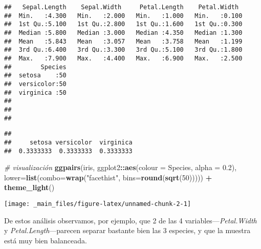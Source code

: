 \documentclass[]{book}
\newenvironment{Shaded}{\begin{snugshade}}{\end{snugshade}}
\newcommand{\CommentTok}[1]{\textcolor[rgb]{0.56,0.35,0.01}{\textit{#1}}}
\newcommand{\DataTypeTok}[1]{\textcolor[rgb]{0.13,0.29,0.53}{#1}}
\newcommand{\DecValTok}[1]{\textcolor[rgb]{0.00,0.00,0.81}{#1}}
\newcommand{\FloatTok}[1]{\textcolor[rgb]{0.00,0.00,0.81}{#1}}
\newcommand{\KeywordTok}[1]{\textcolor[rgb]{0.13,0.29,0.53}{\textbf{#1}}}
\newcommand{\NormalTok}[1]{#1}
\newcommand{\OperatorTok}[1]{\textcolor[rgb]{0.81,0.36,0.00}{\textbf{#1}}}
\newcommand{\StringTok}[1]{\textcolor[rgb]{0.31,0.60,0.02}{#1}}
\begin{document}
\begin{verbatim}
##   Sepal.Length    Sepal.Width     Petal.Length    Petal.Width   
##  Min.   :4.300   Min.   :2.000   Min.   :1.000   Min.   :0.100  
##  1st Qu.:5.100   1st Qu.:2.800   1st Qu.:1.600   1st Qu.:0.300  
##  Median :5.800   Median :3.000   Median :4.350   Median :1.300  
##  Mean   :5.843   Mean   :3.057   Mean   :3.758   Mean   :1.199  
##  3rd Qu.:6.400   3rd Qu.:3.300   3rd Qu.:5.100   3rd Qu.:1.800  
##  Max.   :7.900   Max.   :4.400   Max.   :6.900   Max.   :2.500  
##        Species  
##  setosa    :50  
##  versicolor:50  
##  virginica :50  
##                 
##                 
## 
\end{verbatim}

\begin{Shaded}
\end{Shaded}

\begin{verbatim}
## 
##     setosa versicolor  virginica 
##  0.3333333  0.3333333  0.3333333
\end{verbatim}

\begin{Shaded}
\begin{Highlighting}[]
\CommentTok{# visualización}
\KeywordTok{ggpairs}\NormalTok{(iris, ggplot2}\OperatorTok{::}\KeywordTok{aes}\NormalTok{(}\DataTypeTok{colour =}\NormalTok{ Species, }\DataTypeTok{alpha =} \FloatTok{0.2}\NormalTok{), }\DataTypeTok{lower=}\KeywordTok{list}\NormalTok{(}\DataTypeTok{combo=}\KeywordTok{wrap}\NormalTok{(}\StringTok{"facethist"}\NormalTok{,  }
\DataTypeTok{bins=}\KeywordTok{round}\NormalTok{(}\KeywordTok{sqrt}\NormalTok{(}\DecValTok{50}\NormalTok{))))) }\OperatorTok{+}\StringTok{ }\KeywordTok{theme_light}\NormalTok{()}
\end{Highlighting}
\end{Shaded}

\begin{center}\texttt{[image: \_main\_files/figure-latex/unnamed-chunk-2-1]} \end{center}

De estos análisis observamos, por ejemplo, que 2 de las 4 variables---\emph{Petal.Width} y \emph{Petal.Length}---parecen separar bastante bien las 3 especies, y que la muestra está muy bien balanceada.
\end{document}
